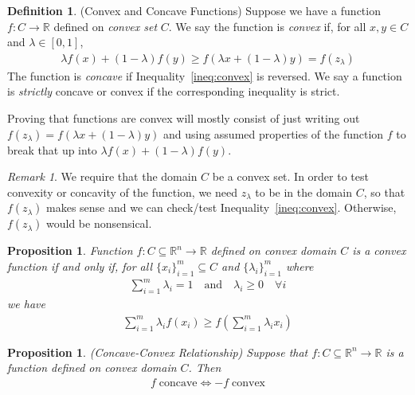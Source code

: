 \documentclass[12pt]{article}
\numberwithin{equation}{section} %
\theoremstyle{plain}
\newtheorem{prop}[thm]{Proposition}
\theoremstyle{definition}
\newtheorem{defn}[thm]{Definition}
\theoremstyle{remark}
\newtheorem*{rmk}{Remark}
\newcommand{\R}{\mathbb{R}}
\newcommand{\Rn}{\mathbb{R}^n}
\begin{document}
\begin{defn}{(Convex and Concave Functions)}
Suppose we have a function $f:C\rightarrow \R$ defined on \emph{convex
set} $C$. We say the function is \emph{convex} if, for all $x,y\in C$
and $\lambda \in[0,1]$,
\begin{align}
  \label{ineq:convex}
  \lambda f(x) + (1-\lambda) f(y) \geq f(\lambda x + (1-\lambda)y) =
  f(z_\lambda)
\end{align}
The function is \emph{concave} if Inequality~\ref{ineq:convex} is
reversed. We say a function is \emph{strictly} concave or convex if the
corresponding inequality is strict.

Proving that functions are convex will mostly consist of just writing
out $f(z_\lambda) = f(\lambda x + (1-\lambda)y)$ and using assumed
properties of the function $f$ to break that up into $\lambda f(x) +
(1-\lambda)f(y)$.
\end{defn}
\begin{rmk}
We require that the domain $C$ be a convex set.  In order to test
convexity or concavity of the function, we need $z_\lambda$ to be in the
domain $C$, so that $f(z_\lambda)$ makes sense and we can check/test
Inequality~\ref{ineq:convex}. Otherwise, $f(z_\lambda)$ would be
nonsensical.
\end{rmk}

\begin{prop}
Function $f:C\subseteq\Rn\rightarrow \R$ defined on convex domain $C$ is
a convex function if and only if, for all $\{x_i\}_{i=1}^m\subseteq C$
and $\{\lambda_i\}_{i=1}^m$ where
\begin{align*}
  \sum^{m}_{i=1} \lambda_i = 1
  \quad \text{and} \quad \lambda_i \geq 0 \quad \forall i
\end{align*}
we have
\begin{align*}
  \sum^m_{i=1} \lambda_i f(x_i)
  \geq
  f\left(\sum^m_{i=1} \lambda_i x_i\right)
\end{align*}
\end{prop}

\begin{prop}{\emph{(Concave-Convex Relationship)}}
Suppose that $f:C\subseteq\Rn\rightarrow \R$ is a function defined on
convex domain $C$. Then
\begin{align*}
  f \; \text{concave}
  \iff
  -f \; \text{convex}
\end{align*}
\end{prop}
\end{document}
